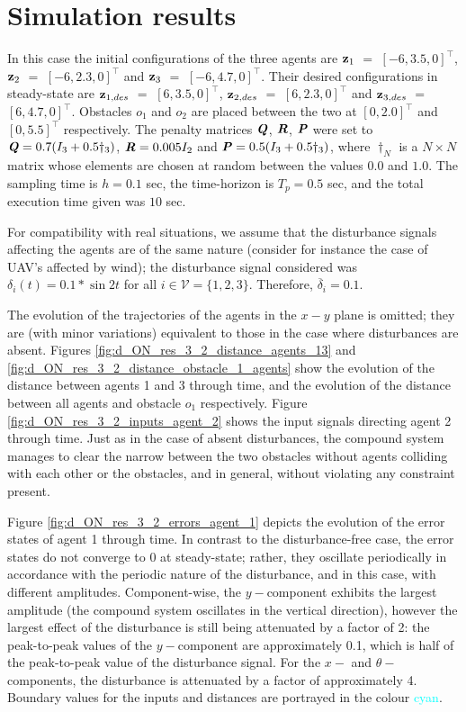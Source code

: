 \section{Simulation results}

In this case the initial configurations of the three agents are
$\bm{\mathbf{z}}_1$ $=$ $[-6, 3.5, 0]^{\top}$,
$\bm{\mathbf{z}}_2$ $=$ $[-6, 2.3, 0]^{\top}$ and
$\bm{\mathbf{z}}_3$ $=$ $[-6, 4.7, 0]^{\top}$.
Their desired configurations in steady-state are
$\bm{\mathbf{z}}_{1,des}$ $=$ $[6, 3.5, 0]^{\top}$,
$\bm{\mathbf{z}}_{2,des}$ $=$ $[6, 2.3, 0]^{\top}$ and
$\bm{\mathbf{z}}_{3,des}$ $=$ $[6, 4.7, 0]^{\top}$.
Obstacles $o_1$ and $o_2$ are placed between the two at $[0, 2.0]^{\top}$
and $[0, 5.5]^{\top}$ respectively. The penalty
matrices $\bm{\mathit{Q}}$, $\bm{\mathit{R}}$, $\bm{\mathit{P}}$ were set to
$\bm{\mathit{Q}} = 0.7 (I_3 + 0.5\dagger_3)$, $\bm{\mathit{R}} = 0.005 I_2$ and
$\bm{\mathit{P}} = 0.5 (I_3 + 0.5\dagger_3)$, where $\dagger_N$ is a $N \times N$
matrix whose elements are chosen at random between the values $0.0$ and $1.0$.
The sampling time is $h = 0.1$ sec, the time-horizon is $T_p = 0.5$ sec, and
the total execution time given was $10$ sec.

For compatibility with real situations, we assume that the disturbance signals
affecting the agents are of the same nature (consider for instance the case
of UAV's affected by wind); the disturbance signal considered was
$\delta_i(t) = 0.1 * \sin 2t$ for all $i \in \mathcal{V} = \{1,2,3\}$.
Therefore, $\overline{\delta}_i = 0.1$.

The evolution of the trajectories of the agents in the
$x-y$ plane is omitted; they are (with minor variations) equivalent to those
in the case where disturbances are absent. Figures
\eqref{fig:d_ON_res_3_2_distance_agents_13} and
\eqref{fig:d_ON_res_3_2_distance_obstacle_1_agents} show the evolution of the
distance between agents 1 and 3 through time, and the evolution of the
distance between all agents and obstacle $o_1$ respectively.
Figure \eqref{fig:d_ON_res_3_2_inputs_agent_2} shows the input signals
directing agent 2 through time. Just as in the case of absent disturbances,
the compound system manages to clear the narrow between the two obstacles without
agents colliding with each other or the obstacles, and in general, without
violating any constraint present.

Figure \eqref{fig:d_ON_res_3_2_errors_agent_1} depicts the evolution of the
error states of agent 1 through time. In contrast to the disturbance-free
case, the error states do not converge to 0 at steady-state; rather, they
oscillate periodically in accordance with the periodic nature of the disturbance,
and in this case, with different amplitudes. Component-wise,
the $y-$component exhibits the largest amplitude (the compound system oscillates
in the vertical direction), however the largest effect of the disturbance
is still being attenuated by a factor of 2: the peak-to-peak values of the
$y-$component are approximately 0.1, which is half of the peak-to-peak value
of the disturbance signal. For the $x-$ and $\theta-$components, the
disturbance is attenuated by a factor of approximately 4.
Boundary values for the inputs and distances are portrayed in the colour
\textcolor{cyan}{cyan}.


